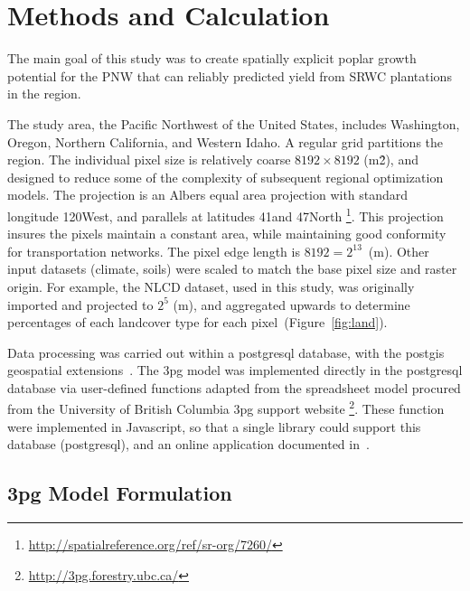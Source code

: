 \documentclass[preprint,12pt]{elsarticle}
\begin{document}
\section{Methods and Calculation}

The main goal of this study was to create spatially explicit poplar
growth potential for the \ac{PNW} that can reliably predicted yield from \ac{SRWC}
plantations in the region.

The study area, the Pacific Northwest of the United States,
includes Washington, Oregon, Northern California, and Western
Idaho.  A regular grid partitions the region.  The individual pixel size is
relatively coarse $8192 \times 8192$ (m\^2), and designed to reduce
some of the complexity of subsequent regional optimization models.
The projection is an Albers equal area projection with standard
longitude 120\degree West, and parallels at latitudes 41\degree and
47\degree North \footnote{\href{http://spatialreference.org/ref/sr-org/7260/}{http://spatialreference.org/ref/sr-org/7260/}}. This projection insures the pixels
maintain a constant area, while maintaining good conformity for
transportation networks.  The pixel edge length is $8192 =
2^{13}$~(m). Other input datasets (climate, soils) were scaled to match the
base pixel size and raster origin. For example, the \ac{NLCD} dataset,
used in this study, was originally  imported and projected to $2^5$
(m), and aggregated upwards to determine percentages of each landcover
type for each pixel~(Figure~\ref{fig:land}). 

Data processing was carried out within a postgresql database, with the
postgis geospatial extensions~\cite{pgsql,Holl2009,postgis}.  The
\ac{3pg} model was implemented directly in the postgresql database via
user-defined functions adapted from the spreadsheet model procured
from the University of British Columbia \ac{3pg} support website \footnote{\href{http://3pg.forestry.ubc.ca/}{http://3pg.forestry.ubc.ca/}}.  These function were implemented in
Javascript, so that a single library could support this database (postgresql), and an
online application documented in~\cite{Prilepova2014}.

\subsection{\acs{3pg} Model Formulation}
\label{sec:3pg}
\end{document}
